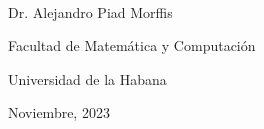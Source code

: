 \begin{opinion}	
	

\vspace{1cm}


\begin{flushright}
	\underline{\hspace{6.5cm}}\\
	Dr. Alejandro Piad Morffis
	
	Facultad de Matemática y Computación
	
	Universidad de la Habana
	
	Noviembre, 2023
\end{flushright}

\end{opinion}